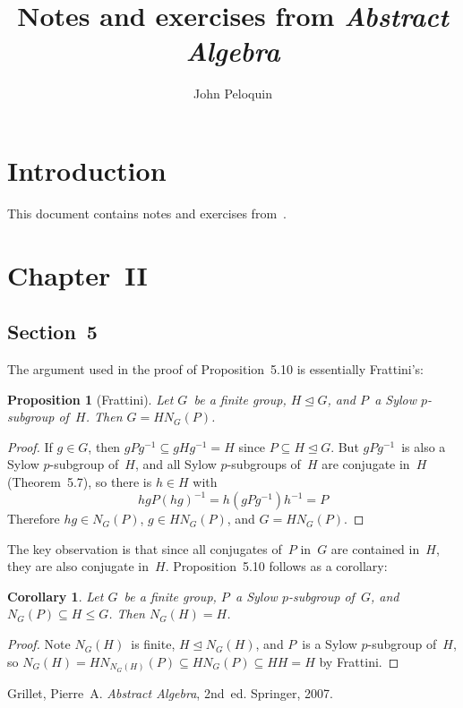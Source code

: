 \documentclass[letterpaper,12pt]{article}
\title{Notes and exercises from \textit{Abstract Algebra}}
\author{John Peloquin}
\date{}
\newcommand{\subgroupeq}{\le}
\newcommand{\nsubgroupeq}{\trianglelefteq}
\theoremstyle{definition}
\theoremstyle{remark}
\theoremstyle{plain}
\newtheorem*{prop}{Proposition}
\newtheorem*{cor}{Corollary}
\begin{document}
\maketitle

\section*{Introduction}
This document contains notes and exercises from~\cite{grillet}.

\section*{Chapter~II}
\subsection*{Section~5}

The argument used in the proof of Proposition~5.10 is essentially Frattini's:
\begin{prop}[Frattini]
Let \(G\)~be a finite group, \(H\nsubgroupeq G\), and \(P\)~a Sylow \(p\)-subgroup of~\(H\). Then \(G=HN_G(P)\).
\end{prop}
\begin{proof}
If \(g\in G\), then \(gPg^{-1}\subseteq gHg^{-1}=H\) since \(P\subseteq H\nsubgroupeq G\). But \(gPg^{-1}\)~is also a Sylow \(p\)-subgroup of~\(H\), and all Sylow \(p\)-subgroups of~\(H\) are conjugate in~\(H\) (Theorem~5.7), so there is \(h\in H\) with
\[hgP(hg)^{-1}=h(gPg^{-1})h^{-1}=P\]
Therefore \(hg\in N_G(P)\), \(g\in HN_G(P)\), and \(G=HN_G(P)\).
\end{proof}
\noindent The key observation is that since all conjugates of~\(P\) in~\(G\) are contained in~\(H\), they are also conjugate in~\(H\). Proposition~5.10 follows as a corollary:
\begin{cor}
Let \(G\)~be a finite group, \(P\)~a Sylow \(p\)-subgroup of~\(G\), and \(N_G(P)\subseteq H\subgroupeq G\). Then \(N_G(H)=H\).
\end{cor}
\begin{proof}
Note \(N_G(H)\)~is finite, \(H\nsubgroupeq N_G(H)\), and \(P\)~is a Sylow \(p\)-subgroup of~\(H\), so \(N_G(H)=HN_{N_G(H)}(P)\subseteq HN_G(P)\subseteq HH=H\) by Frattini.
\end{proof}

\begin{thebibliography}{0}
 Grillet, Pierre~A. \textit{Abstract Algebra}, 2nd~ed. Springer, 2007.
\end{thebibliography}
\end{document}
